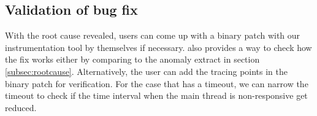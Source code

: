 %
%
\subsection{Validation of bug fix}
With the root cause revealed, users can come up with a binary patch with our instrumentation tool by themselves if necessary.
\xxx also provides a way to check how the fix works either by comparing to the anomaly extract in section \ref{subsec:rootcause}. Alternatively, the user can add the tracing points in the binary patch for verification.
For the case that has a timeout, we can narrow the timeout to check if the time interval when the main thread is non-responsive get reduced.
